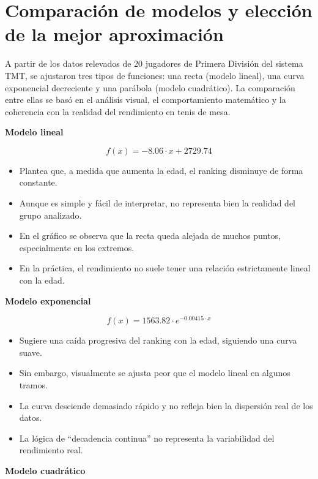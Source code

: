 \documentclass[12pt]{article}
\begin{document}
\newpage
\section*{Comparación de modelos y elección de la mejor aproximación}

A partir de los datos relevados de 20 jugadores de Primera División del sistema TMT, se ajustaron tres tipos de funciones: una recta (modelo lineal), una curva exponencial decreciente y una parábola (modelo cuadrático). La comparación entre ellas se basó en el análisis visual, el comportamiento matemático y la coherencia con la realidad del rendimiento en tenis de mesa.

\vspace{0.4cm}
\noindent\textbf{Modelo lineal}

\[
f(x) = -8.06 \cdot x + 2729.74
\]

\begin{itemize}
    \item Plantea que, a medida que aumenta la edad, el ranking disminuye de forma constante.
    \item Aunque es simple y fácil de interpretar, no representa bien la realidad del grupo analizado.
    \item En el gráfico se observa que la recta queda alejada de muchos puntos, especialmente en los extremos.
    \item En la práctica, el rendimiento no suele tener una relación estrictamente lineal con la edad.
\end{itemize}

\vspace{0.2cm}
\noindent\textbf{ Modelo exponencial}

\[
f(x) = 1563.82 \cdot e^{-0.00415 \cdot x}
\]

\begin{itemize}
    \item Sugiere una caída progresiva del ranking con la edad, siguiendo una curva suave.
    \item Sin embargo, visualmente se ajusta peor que el modelo lineal en algunos tramos.
    \item La curva desciende demasiado rápido y no refleja bien la dispersión real de los datos.
    \item La lógica de “decadencia continua” no representa la variabilidad del rendimiento real.
\end{itemize}

\vspace{0.2cm}
\noindent\textbf{Modelo cuadrático}
\end{document}
